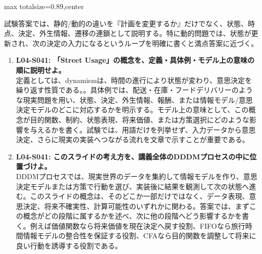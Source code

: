 \begin{minipage}[t]{0.58\textwidth}
\begin{adjustbox}{max totalsize={\textwidth}{0.89\textheight},center}
\begin{minipage}{\textwidth}
試験答案では、静的/動的の違いを『計画を変更するか』だけでなく、状態、時点、決定、外生情報、遷移の連鎖として説明する。特に動的問題では、状態が更新され、次の決定の入力になるというループを明確に書くと満点答案に近づく。\par{}\begin{enumerate}\item \textbf{L04-S041: 「Street Usage」の概念を、定義・具体例・モデル上の意味の順に説明せよ。}\\定義としては、dynamismは、時間の進行により状態が変わり、意思決定を繰り返す性質である。。具体例では、配送・在庫・フードデリバリーのような現実問題を用い、状態、決定、外生情報、報酬、または情報モデル/意思決定モデルのどこに対応するかを明示する。モデル上の意味として、この概念が目的関数、制約、状態表現、将来価値、または方策選択にどのような影響を与えるかを書く。試験では、用語だけを列挙せず、入力データから意思決定、さらに現実の実装へつながる流れを文章で示すことが重要である。\item \textbf{L04-S041: このスライドの考え方を、講義全体のDDDMプロセスの中に位置づけよ。}\\DDDMプロセスでは、現実世界のデータを集約して情報モデルを作り、意思決定モデルまたは方策で行動を選び、実装後に結果を観測して次の状態へ進む。このスライドの概念は、そのどこか一部だけではなく、データ表現、意思決定、将来不確実性、計算可能性のいずれかに関わる。答案では、まずこの概念がどの段階に属するかを述べ、次に他の段階へどう影響するかを書く。例えば価値関数なら将来価値を現在決定へ戻す役割、FIFOなら旅行時間情報モデルの整合性を保証する役割、CFAなら目的関数を調整して将来に良い行動を誘導する役割である。\end{enumerate}
\end{minipage}
\end{adjustbox}
\end{minipage}


